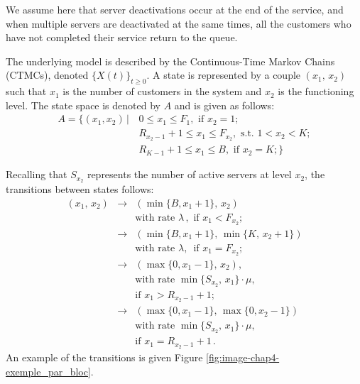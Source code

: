 \documentclass[conference]{IEEEtran}
\begin{document}
We assume here that server deactivations occur at the end of the service, and when multiple servers are deactivated at the same times, 
all the customers who have not completed their service return to the queue.



The underlying model is  described by the Continuous-Time Markov Chains (CTMCs), denoted   $\{X(t)\}_{t \geq 0}$.
A state is represented by a couple $(x_{1},\,x_{2})$ such that $x_{1}$ is the number of customers in the system and $x_{2}$ is the functioning level.
The state space is denoted by $A$ and is given as follows:
\begin{align*}
A=\{(x_{1},x_{2}) \, | \,  & 0 \leq x_{1} \leq F_{1},  \text{ if } x_{2}=1 ; \\
                           & R_{x_2-1}+1 \leq x_{1} \leq F_{x_2}, \text{ s.t. } 1 < x_2 < K ; \\
                           & R_{K-1}+1 \leq x_{1} \leq B,  \text{ if } x_{2}=K;
\}
\end{align*}

Recalling that   $S_{x_2}$ represents the number of active servers at level $x_2$, the transitions between states follows:
\begin{equation*}
\begin{array}{rcl}
\! \! (x_{1},\,x_{2})\! & \! \rightarrow & (\min\{B,x_{1}+1\},\,x_{2}) \\
                & & \! \text{with rate } \lambda \, , \text{ if } x_{1} < F_{x_2} ;\\
                & \! \rightarrow & (\min\{B,x_{1}+1\},\,\min\{K,\,x_{2}+1\}) \\
                & & \! \text{with rate } \lambda , \, \text{ if } x_{1}=F_{x_2} ; \\   
                & \! \rightarrow &  (\max\{0,x_{1}-1\},\,x_{2}) , \\              
                & & \! \text{with rate }  \min\{S_{x_{2}},\,x_{1}\} \cdot \mu,    \\          
                & & \! \text{if } x_{1} \! > R_{x_2-1} \!+\! 1  ; \\
                & \! \rightarrow & (\max\{0,x_{1}-1\},\,\max\{0,x_{2}-1\}) \\               
                & & \! \text{with rate }   \min\{S_{x_{2}},\,x_{1}\} \cdot \mu,    \\             
                & & \! \text{if }   x_{1}=R_{x_2-1}+1  \, .       
\end{array}
\end{equation*}
An example of the transitions is given Figure \ref{fig:image-chap4-exemple_par_bloc}.
\end{document}
